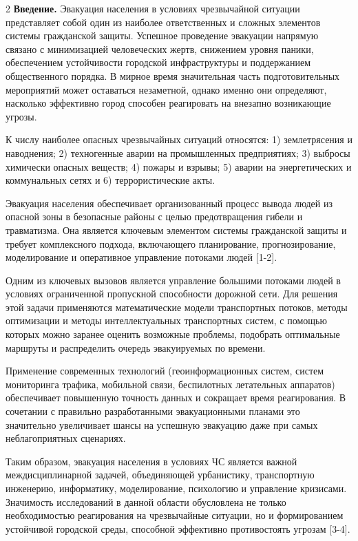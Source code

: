 \begin{multicols}{2}
{\bfseries Введение.} Эвакуация населения в условиях чрезвычайной ситуации
представляет собой один из наиболее ответственных и сложных элементов
системы гражданской защиты. Успешное проведение эвакуации напрямую
связано с минимизацией человеческих жертв, снижением уровня паники,
обеспечением устойчивости городской инфраструктуры и поддержанием
общественного порядка. В мирное время значительная часть
подготовительных мероприятий может оставаться незаметной, однако именно
они определяют, насколько эффективно город способен реагировать на
внезапно возникающие угрозы.

К числу наиболее опасных чрезвычайных ситуаций относятся: 1)
землетрясения и наводнения; 2) техногенные аварии на промышленных
предприятиях; 3) выбросы химически опасных веществ; 4) пожары и взрывы;
5) аварии на энергетических и коммунальных сетях и 6) террористические
акты.

Эвакуация населения обеспечивает организованный процесс вывода людей из
опасной зоны в безопасные районы с целью предотвращения гибели и
травматизма. Она является ключевым элементом системы гражданской защиты
и требует комплексного подхода, включающего планирование,
прогнозирование, моделирование и оперативное управление потоками людей
{[}1-2{]}.

Одним из ключевых вызовов является управление большими потоками людей в
условиях ограниченной пропускной способности дорожной сети. Для решения
этой задачи применяются математические модели транспортных потоков,
методы оптимизации и методы интеллектуальных транспортных систем, с
помощью которых можно заранее оценить возможные проблемы, подобрать
оптимальные маршруты и распределить очередь эвакуируемых по времени.

Применение современных технологий (геоинформационных систем, систем
мониторинга трафика, мобильной связи, беспилотных летательных аппаратов)
обеспечивает повышенную точность данных и сокращает время реагирования.
В сочетании с правильно разработанными эвакуационными планами это
значительно увеличивает шансы на успешную эвакуацию даже при самых
неблагоприятных сценариях.

Таким образом, эвакуация населения в условиях ЧС является важной
междисциплинарной задачей, объединяющей урбанистику, транспортную
инженерию, информатику, моделирование, психологию и управление
кризисами. Значимость исследований в данной области обусловлена не
только необходимостью реагирования на чрезвычайные ситуации, но и
формированием устойчивой городской среды, способной эффективно
противостоять угрозам {[}3-4{]}.


\end{multicols}
